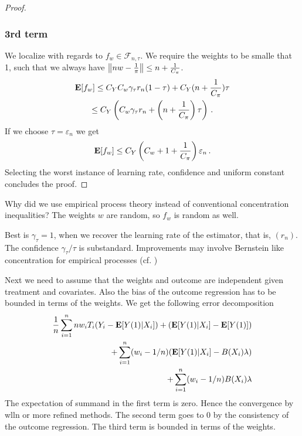 \begin{proof}
\subsubsection*{3rd term}
We localize with regards to 
$
f_w \in \mathcal{F}_{n,\tau}
.
$
We require the weights to be smalle that 1, such that 
we always have
$
\left\lVert nw-  \frac{1}{\pi}\right\rVert
\le
n + \frac{1}{C_\pi}
$.
\begin{gather}
  \mathbf{E}[f_w]
  \le
  C_Y 
  C_w
  \gamma_\tau
  r_n
  (1-\tau)
  +
  C_Y
  (
n + \frac{1}{C_\pi}
  )
  \tau
  \\
  \le
  C_Y
  \left( 
  C_w
  \gamma_\tau
  r_n
  +
  \left(
n + \frac{1}{C_\pi}
  \right)
  \tau
  \right)
  \,.
\end{gather}
If we choose  $\tau=\varepsilon_n$
we get
\begin{gather}
  \mathbf{E}[f_w]
  \le
  C_Y
  \left( 
C_w+1+ \frac{1}{C_\pi}
  \right)
  \varepsilon_n
  \,.
\end{gather}
Selecting the worst instance of learning rate, confidence and uniform constant concludes the proof.

\end{proof}

\begin{reflection*}
  Why did we use empirical process theory instead of conventional concentration inequalities?
  The weights $w$ are random, so $f_w$ is random as well. 


Best is $\gamma_\tau=1$, when we recover the learning rate of the estimator, that is, $(r_n)$.
The confidence $\gamma_\tau/\tau$ is substandard. Improvements may involve Bernstein like concentration for empirical processes (cf. \cite[Section~2.14.2]{vaart2013})
\end{reflection*}

Next we need to assume that the weights and outcome are independent given treatment and covariates.
Also the bias of the outcome regression has to be bounded in terms of the weights. We get the following error decomposition
\begin{align}
  \frac{1}{n}
  \sum_{i=1}^{n}
  nw_i T_i (Y_i - \mathbf{E}[Y(1)|X_i])
  +
  (\mathbf{E}[Y(1)|X_i]-\mathbf{E}[Y(1)])
  \\
  +
  \sum_{i=1}^{n} 
  (w_i-1/n)
  (
  \mathbf{E}[Y(1)|X_i]
  -
  B(X_i)\lambda
  )
  \\
  +
  \sum_{i=1}^{n} 
  (w_i-1/n)
  B(X_i)\lambda
\end{align}
The expectation of summand in the first term is zero. Hence the convergence by wlln or more refined methods.
The second term goes to 0 by the consistency of the outcome regression.
The third term is bounded in terms of the weights.

